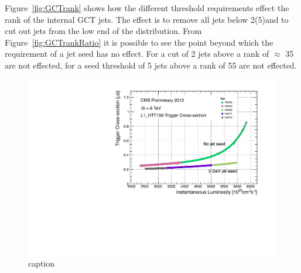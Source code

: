 Figure~\ref{fig:GCTrank} shows how the different threshold requirements effect the rank of the internal GCT jets.
The effect is to remove all jets below 2(5)\GeV and to cut out jets from the low end of the distribution. 
From Figure~\ref{fig:GCTrankRatio} it is possible to see the point beyond which the requirement of a jet seed has no effect. 
For a cut of 2 \GeV jets above a rank of $\approx$ 35 are not effected, for a seed threshold of 5 \GeV jets above a 
rank of 55 are not effected.




\begin{figure}[htbp]
  \centering
    \includegraphics[width=\textwidth]{figures/LoneTrigger/HTT150_pileup.pdf}
  \caption{caption}
  \label{fig:figures_LoneTrigger_HTT150_pileup}
\end{figure}



